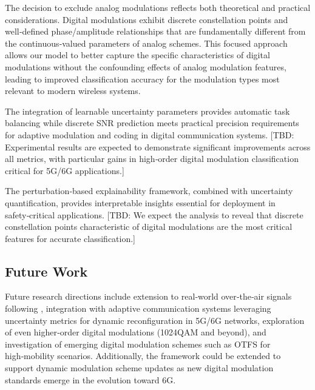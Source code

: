 \documentclass{ELSP}
\begin{document}
The decision to exclude analog modulations reflects both theoretical and practical considerations. Digital modulations exhibit discrete constellation points and well‑defined phase/amplitude relationships that are fundamentally different from the continuous‑valued parameters of analog schemes. This focused approach allows our model to better capture the specific characteristics of digital modulations without the confounding effects of analog modulation features, leading to improved classification accuracy for the modulation types most relevant to modern wireless systems.

The integration of learnable uncertainty parameters provides automatic task balancing while discrete SNR prediction meets practical precision requirements for adaptive modulation and coding in digital communication systems. [TBD: Experimental results are expected to demonstrate significant improvements across all metrics, with particular gains in high‑order digital modulation classification critical for 5G/6G applications.]

The perturbation‑based explainability framework, combined with uncertainty quantification, provides interpretable insights essential for deployment in safety‑critical applications. [TBD: We expect the analysis to reveal that discrete constellation points characteristic of digital modulations are the most critical features for accurate classification.]

\subsection*{Future Work}
Future research directions include extension to real‑world over‑the‑air signals following \cite{o2018over}, integration with adaptive communication systems leveraging uncertainty metrics for dynamic reconfiguration in 5G/6G networks, exploration of even higher‑order digital modulations (1024QAM and beyond), and investigation of emerging digital modulation schemes such as OTFS for high‑mobility scenarios. Additionally, the framework could be extended to support dynamic modulation scheme updates as new digital modulation standards emerge in the evolution toward 6G.



\end{document}
